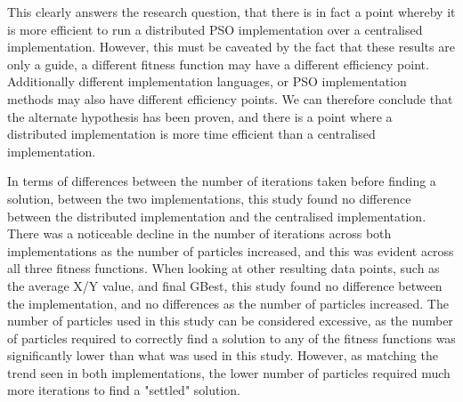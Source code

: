 \documentclass[oneside,12pt]{book}
\begin{document}
This clearly answers the research question, that there is in fact a point whereby it is more efficient to run a distributed PSO implementation over a centralised implementation. However, this must be caveated by the fact that these results are only a guide, a different fitness function may have a different efficiency point. Additionally different implementation languages, or PSO implementation methods may also have different efficiency points. 
We can therefore conclude that the alternate hypothesis has been proven, and there is a point where a distributed implementation is more time efficient than a centralised implementation. 

In terms of differences between the number of iterations taken before finding a solution, between the two implementations, this study found no difference between the distributed implementation and the centralised implementation. There was a noticeable decline in the number of iterations across both implementations as the number of particles increased, and this was evident across all three fitness functions. When looking at other resulting data points, such as the average X/Y value, and final GBest, this study found no difference between the implementation, and no differences as the number of particles increased. The number of particles used in this study can be considered excessive, as the number of particles required to correctly find a solution to any of the fitness functions was significantly lower than what was used in this study. However, as matching the trend seen in both implementations, the lower number of particles required much more iterations to find a "settled" solution. 
\end{document}
